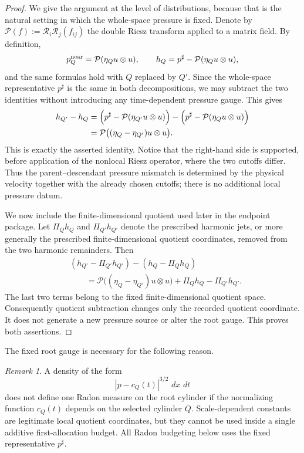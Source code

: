\documentclass[11pt]{article}
\theoremstyle{definition}\newtheorem{problem}[theorem]{Problem}
\theoremstyle{definition}
\theoremstyle{remark}
\newtheorem{remark}[theorem]{Remark}
\newcommand{\dd}{\,d}
\begin{document}
\begin{proof}
We give the argument at the level of distributions, because that is the
natural setting in which the whole-space pressure is fixed.  Denote by
\(
\mathcal P(f):=\mathcal R_i\mathcal R_j(f_{ij})
\)
the double Riesz transform applied to a matrix field.  By definition,
\[
 p_Q^{\rm near}=\mathcal P(\eta_Q u\otimes u),
 \qquad
 h_Q=p^\sharp-\mathcal P(\eta_Q u\otimes u),
\]
and the same formulas hold with \(Q\) replaced by \(Q'\).  Since the
whole-space representative \(p^\sharp\) is the same in both decompositions,
we may subtract the two identities without introducing any time-dependent
pressure gauge.  This gives
\[
\begin{aligned}
 h_{Q'}-h_Q
 &=\Bigl(p^\sharp-\mathcal P(\eta_{Q'}u\otimes u)\Bigr)
   -\Bigl(p^\sharp-\mathcal P(\eta_Qu\otimes u)\Bigr)\\
 &=\mathcal P\bigl((\eta_Q-\eta_{Q'})u\otimes u\bigr).
\end{aligned}
\]
This is exactly the asserted identity.  Notice that the right-hand side is
supported, before application of the nonlocal Riesz operator, where the two
cutoffs differ.  Thus the parent--descendant pressure mismatch is determined
by the physical velocity together with the already chosen cutoffs; there is
no additional local pressure datum.

We now include the finite-dimensional quotient used later in the endpoint
package.  Let \(\Pi_Q h_Q\) and \(\Pi_{Q'}h_{Q'}\) denote the prescribed
harmonic jets, or more generally the prescribed finite-dimensional quotient
coordinates, removed from the two harmonic remainders.  Then
\[
\begin{aligned}
 &(h_{Q'}-\Pi_{Q'}h_{Q'})-(h_Q-\Pi_Qh_Q)\\
 &\qquad=
 \mathcal P\bigl((\eta_Q-\eta_{Q'})u\otimes u\bigr)
 +\Pi_Qh_Q-\Pi_{Q'}h_{Q'}.
\end{aligned}
\]
The last two terms belong to the fixed finite-dimensional quotient space.
Consequently quotient subtraction changes only the recorded quotient
coordinate.  It does not generate a new pressure source or alter the root
gauge.  This proves both assertions.
\end{proof}

The fixed root gauge is necessary for the following reason.
\begin{remark}
A density of the form
\[
  |p-c_Q(t)|^{3/2}\,\dd x\,\dd t
\]
does not define one Radon measure on the root cylinder if the normalizing
function \(c_Q(t)\) depends on the selected cylinder \(Q\).  Scale-dependent
constants are legitimate local quotient coordinates, but they cannot be used
inside a single additive first-allocation budget.  All Radon budgeting below uses
the fixed representative \(p^\sharp\).
\end{remark}
\end{document}
